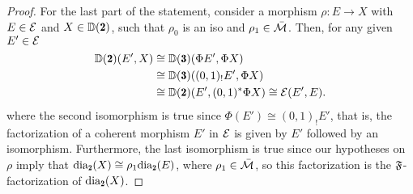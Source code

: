 \begin{proof}
For the last part of the statement, consider a morphism $\rho\colon E\to X$ with $E\in \mathcal{E}$ and $X\in \D(\due)$, such that $\rho_0$ is an iso and $\rho_1\in\bar{\mathcal{M}}$. Then, for any given $E'\in\mathcal{E}$
\begin{align*}
\D(\due)(E',X)&\cong \D(\tre)(\Phi E',\Phi X)\\
&\cong \D(\tre)((0,1)_!E',\Phi X)\\
&\cong \D(\due)(E',(0,1)^*\Phi X)\cong \E(E',E).
\end{align*}
where the second isomorphism is true since $\Phi(E')\cong (0,1)_!E'$, that is, the factorization of a coherent morphism $E'$ in $\mathcal{E}$ is given by $E'$ followed by an isomorphism. Furthermore, the last isomorphism is true since our hypotheses on $\rho$ imply that $\dia_\due(X)\cong \rho_1\dia_\due(E)$, where $\rho_1\in \bar {\mathcal{M}}$, so this factorization is the $\mathfrak{F}$-factorization of $\dia_\due(X)$.
\end{proof}

